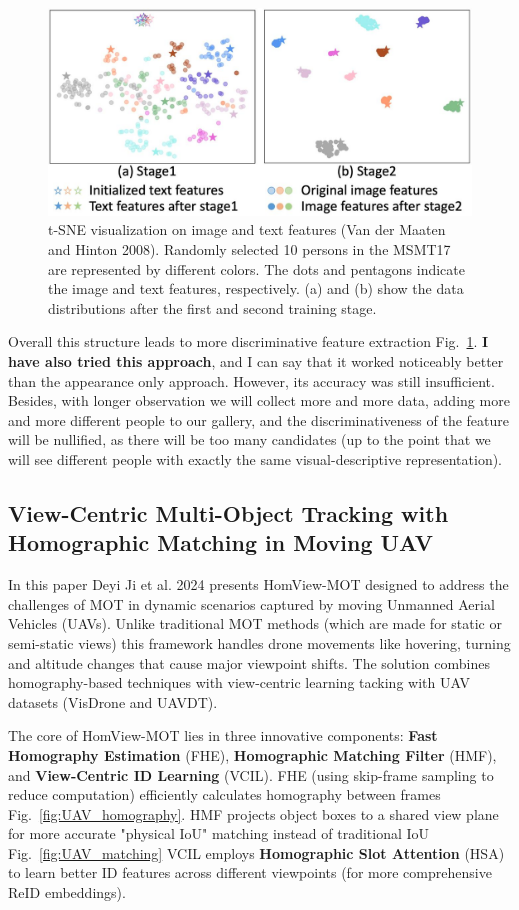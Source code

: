 \documentclass[12pt, a4paper]{article}
\begin{document}
\begin{figure}[h!]
    \centering
    \includegraphics[width=0.65\linewidth]{pictures/clip-tsne.jpeg}
    \caption{t-SNE visualization on image and text features (Van der Maaten and Hinton 2008). Randomly selected 10 persons in the MSMT17 are represented by different colors. The dots and pentagons indicate the image and text features, respectively. (a) and (b) show the data distributions after the first and second training stage.}
    \label{fig:clip-tsne}
\end{figure}


Overall this structure leads to more discriminative feature extraction Fig.~\ref{fig:clip-tsne}. \textbf{I have also tried this approach}, and I can say that it worked noticeably better than the appearance only approach. However, its accuracy was still insufficient. Besides, with longer observation we will collect more and more data, adding more and more different people to our gallery, and the discriminativeness of the feature will be nullified, as there will be too many candidates (up to the point that we will see different people with exactly the same visual-descriptive representation).


\subsection{View-Centric Multi-Object Tracking with Homographic Matching in Moving UAV \cite{Homography-UAV}}

In this paper Deyi Ji et al. 2024 presents HomView-MOT designed to address the challenges of MOT in dynamic scenarios captured by moving Unmanned Aerial Vehicles (UAVs). Unlike traditional MOT methods (which are made for static or semi-static views) this framework handles drone movements like hovering, turning and altitude changes that cause major viewpoint shifts. The solution combines homography-based techniques with view-centric learning tacking with UAV datasets (VisDrone and UAVDT). 

The core of HomView-MOT lies in three innovative components: \textbf{Fast Homography Estimation} (FHE), \textbf{Homographic Matching Filter} (HMF), and \textbf{View-Centric ID Learning} (VCIL). FHE (using skip-frame sampling to reduce computation) efficiently calculates homography between frames Fig.~\ref{fig:UAV_homography}. HMF projects object boxes to a shared view plane for more accurate "physical IoU" matching instead of traditional IoU Fig.~\ref{fig:UAV_matching} VCIL employs \textbf{Homographic Slot Attention} (HSA) to learn better ID features across different viewpoints (for more comprehensive ReID embeddings). 
\end{document}
